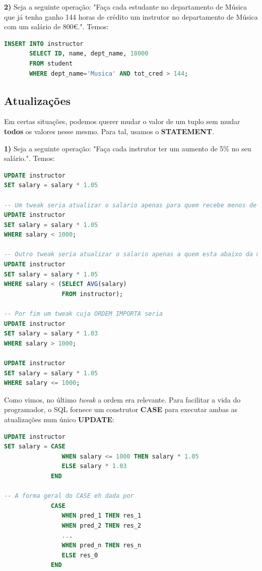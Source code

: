 \documentclass[oneside]{book}
\theoremstyle{definition}
\begin{document}
\textbf{2)} Seja a seguinte operação: "Faça cada estudante no departamento de Música que já tenha ganho 144 horas de crédito um instrutor no departamento de Música com um salário de 800€.". Temos:
\begin{lstlisting}[language=SQL, morekeywords={REFERENCES, REFRESH, MATERIALIZED, CONCURRENTLY}, framesep=8pt, xleftmargin=40pt, framexleftmargin=40pt, frame=tb, framerule=0pt]
INSERT INTO instructor
       SELECT ID, name, dept_name, 18000
       FROM student
       WHERE dept_name='Musica' AND tot_cred > 144;
\end{lstlisting}

\subsection{Atualizações}
Em certas situações, podemos querer mudar o valor de um tuplo sem mudar \textbf{todos} os valores nesse mesmo. Para tal, usamos o \textbf{STATEMENT}.

\textbf{1)} Seja a seguinte operação: "Faça cada instrutor ter um aumento de 5\% no seu salário.". Temos:
\begin{lstlisting}[language=SQL, morekeywords={REFERENCES, REFRESH, MATERIALIZED, CONCURRENTLY}, framesep=8pt, xleftmargin=40pt, framexleftmargin=40pt, frame=tb, framerule=0pt]
UPDATE instructor
SET salary = salary * 1.05

-- Um tweak seria atualizar o salario apenas para quem recebe menos de 1000 pau
UPDATE instructor
SET salary = salary * 1.05
WHERE salary < 1000;

-- Outro tweak seria atualizar o salario apenas a quem esta abaixo da media
UPDATE instructor
SET salary = salary * 1.05
WHERE salary < (SELECT AVG(salary)
                FROM instructor);

-- Por fim um tweak cuja ORDEM IMPORTA seria
UPDATE instructor
SET salary = salary * 1.03
WHERE salary > 1000;

UPDATE instructor
SET salary = salary * 1.05
WHERE salary <= 1000;
\end{lstlisting}

Como vimos, no último \textit{tweak} a ordem era relevante. Para facilitar a vida do programador, o SQL fornece um construtor \textbf{CASE} para executar ambas as atualizações num único \textbf{UPDATE}:
\begin{lstlisting}[language=SQL, morekeywords={REFERENCES, REFRESH, MATERIALIZED, CONCURRENTLY}, framesep=8pt, xleftmargin=40pt, framexleftmargin=40pt, frame=tb, framerule=0pt]
UPDATE instructor
SET salary = CASE
                WHEN salary <= 1000 THEN salary * 1.05
                ELSE salary * 1.03
             END

-- A forma geral do CASE eh dada por
             CASE
                WHEN pred_1 THEN res_1
                WHEN pred_2 THEN res_2
                ...
                WHEN pred_n THEN res_n
                ELSE res_0
             END
\end{lstlisting}
\end{document}
